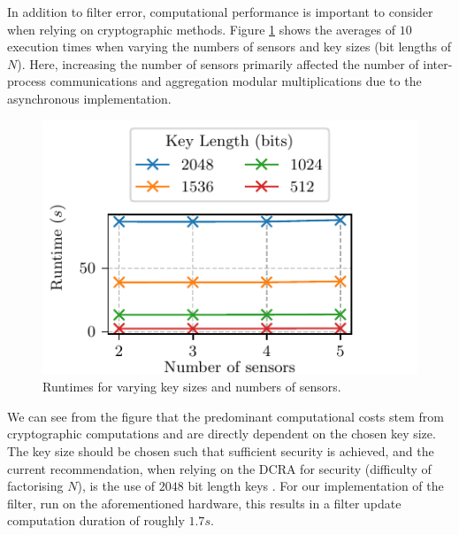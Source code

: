 \documentclass[10pt,letterpaper,oneside,twocolumn,journal]{IEEEtran}
\theoremstyle{definition}
\theoremstyle{definition}
\theoremstyle{remark}
\begin{document}
In addition to filter error, computational performance is important to consider when relying on cryptographic methods. Figure \ref{fig:sim_timing} shows the averages of $10$ execution times when varying the numbers of sensors and key sizes (bit lengths of $N$). Here, increasing the number of sensors primarily affected the number of inter-process communications and aggregation modular multiplications due to the asynchronous implementation.
\begin{figure}[htbp]
    \centering
    \includegraphics{images/timing.pdf}
    \caption{Runtimes for varying key sizes and numbers of sensors.}
    \label{fig:sim_timing}
\end{figure}
We can see from the figure that the predominant computational costs stem from cryptographic computations and are directly dependent on the chosen key size. The key size should be chosen such that sufficient security is achieved, and the current recommendation, when relying on the DCRA for security (difficulty of factorising $N$), is the use of $2048$ bit length keys \cite{barkerRecommendationPairwiseKey2019}. For our implementation of the filter, run on the aforementioned hardware, this results in a filter update computation duration of roughly $1.7s$.

% 
%                                               
%                                               
%                                               
% 
\end{document}
